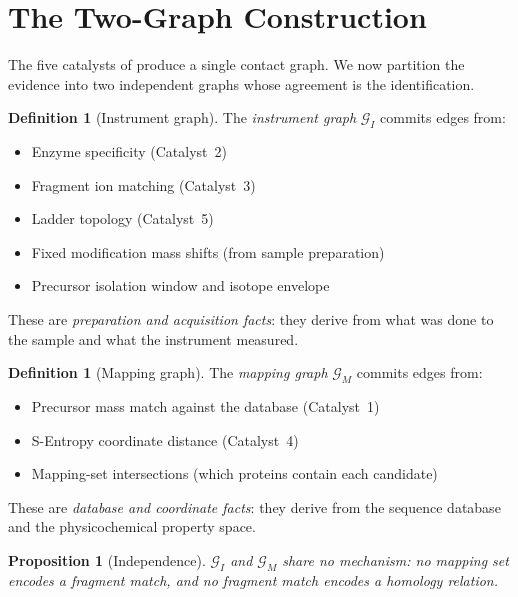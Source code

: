 \documentclass[11pt,a4paper]{article}
\newtheorem{proposition}[theorem]{Proposition}
\theoremstyle{definition}
\newtheorem{definition}[theorem]{Definition}
\theoremstyle{remark}
\newcommand{\Gph}{\mathcal{G}}
\begin{document}
\section{The Two-Graph Construction}
\label{sec:twograph}

The five catalysts of  produce a single contact
graph. We now partition the evidence into two independent graphs whose
agreement is the identification.

\begin{definition}[Instrument graph]
\label{def:inst-graph}
The \emph{instrument graph} $\Gph_I$ commits edges from:
\begin{itemize}[itemsep=1pt]
  \item Enzyme specificity (Catalyst~2)
  \item Fragment ion matching (Catalyst~3)
  \item Ladder topology (Catalyst~5)
  \item Fixed modification mass shifts (from sample preparation)
  \item Precursor isolation window and isotope envelope
\end{itemize}
These are \emph{preparation and acquisition facts}: they derive from
what was done to the sample and what the instrument measured.
\end{definition}

\begin{definition}[Mapping graph]
\label{def:map-graph}
The \emph{mapping graph} $\Gph_M$ commits edges from:
\begin{itemize}[itemsep=1pt]
  \item Precursor mass match against the database (Catalyst~1)
  \item S-Entropy coordinate distance (Catalyst~4)
  \item Mapping-set intersections (which proteins contain each
  candidate)
\end{itemize}
These are \emph{database and coordinate facts}: they derive from the
sequence database and the physicochemical property space.
\end{definition}

\begin{proposition}[Independence]
\label{prop:indep}
$\Gph_I$ and $\Gph_M$ share no mechanism: no mapping set encodes a
fragment match, and no fragment match encodes a homology relation.
\end{proposition}
\end{document}
